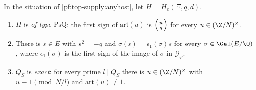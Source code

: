 \begin{lemma}\label{pf:top-supply:anyexact}
In the situation of \cref{pf:top-supply:anyhost}, let $H=H_e(\Xi,q,d)$.
\begin{enumerate}[label=(\roman*)]
\item $H$ is \emph{of type $\mathrm{PsQ}$}: the first sign of $\mathrm{art}(u)$ is $\left(\frac{u}{q}\right)$ for every
$u\in(\Z/N)^\times$.
\item There is $s\in E$ with $s^2=-q$ and $\sigma(s)=\epsilon_1(\sigma)s$ for every $\sigma\in\Gal(E/\Q)$, where
$\epsilon_1(\sigma)$ is the first sign of the image of $\sigma$ in $\mathcal G_\varphi$.
\item $Q_S$ is \emph{exact}: for every prime $l\mid Q_S$ there is $u\in(\Z/N)^\times$ with $u\equiv1\pmod{N/l}$ and
$\mathrm{art}(u)\ne1$.
\end{enumerate}
  
 
 
\end{lemma}

